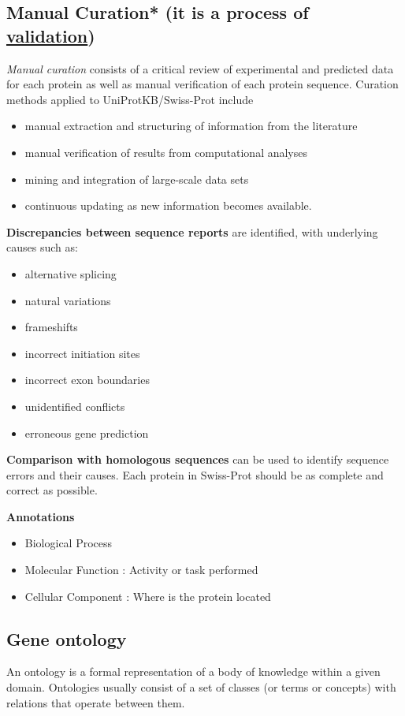 \documentclass[11pt]{article}
\begin{document}
\subsection{Manual Curation* (it is a process of \underline{validation})}
\label{sec:orgad5bea2}
\emph{Manual curation} consists of a critical review of experimental and predicted data
for each protein as well as manual verification of each protein sequence.
Curation methods applied to UniProtKB/Swiss-Prot include
\begin{itemize}
\item manual extraction and structuring of information from the literature
\item manual verification of results from computational analyses
\item mining and integration of large-scale data sets
\item continuous updating as new information becomes available.
\end{itemize}



\textbf{Discrepancies between sequence reports} are identified, with underlying causes such as:
\begin{itemize}
\item alternative splicing
\item natural variations
\item frameshifts
\item incorrect initiation sites
\item incorrect exon boundaries
\item unidentified conflicts
\item erroneous gene prediction
\end{itemize}

\textbf{Comparison with homologous sequences} can be used to identify sequence errors
and their causes. Each protein in Swiss-Prot should be as complete and correct as possible.

\textbf{Annotations}\\
\begin{itemize}
\item Biological Process
\item Molecular Function : Activity or task performed
\item Cellular Component : Where is the protein located
\end{itemize}


\subsection{Gene ontology}
\label{sec:org9b1e2b4}
An ontology is a formal representation of a body of knowledge within a given domain.
Ontologies usually consist of a set of classes (or terms or concepts) with relations that
operate between them.
\end{document}

